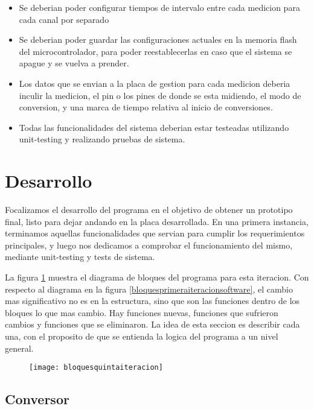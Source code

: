 \begin{itemize}
\item Se deberian poder configurar tiempos de intervalo entre cada medicion para cada canal por separado
\item Se deberian poder guardar las configuraciones actuales en la memoria flash del microcontrolador, para poder reestablecerlas en caso que el sistema se apague y se vuelva a prender.
\item Los datos que se envian a la placa de gestion para cada medicion deberia inculir la medicion, el pin o los pines de donde se esta midiendo, el modo de conversion, y una marca de tiempo relativa al inicio de conversiones.
\item Todas las funcionalidades del sistema deberian estar testeadas utilizando unit-testing y realizando pruebas de sistema.
\end{itemize}



\section{Desarrollo} %
\label{it5:sec:desarrollo}

Focalizamos el desarrollo del programa en el objetivo de obtener un prototipo final, listo para dejar andando en la placa desarrollada. En una primera instancia, terminamos aquellas funcionalidades que servian para cumplir los requerimientos principales, y luego nos dedicamos a comprobar el funcionamiento del mismo, mediante unit-testing y tests de sistema.

La figura \ref{fig:bloquesquintaiteracion} muestra el diagrama de bloques del programa para esta iteracion. Con respecto al diagrama en la figura \ref{bloquesprimeraiteracionsoftware}, el cambio mas significativo no es en la estructura, sino que son las funciones dentro de los bloques lo que mas cambio. Hay funciones nuevas, funciones que sufrieron cambios y funciones que se eliminaron. La idea de esta seccion es describir cada una, con el proposito de que se entienda la logica del programa a un nivel general.

\begin{figure}[h]
  \centering
  \texttt{[image: bloquesquintaiteracion]}
  \caption{}\label{fig:bloquesquintaiteracion}
\end{figure}

\subsection{Conversor} %
\label{sub:conversor}


